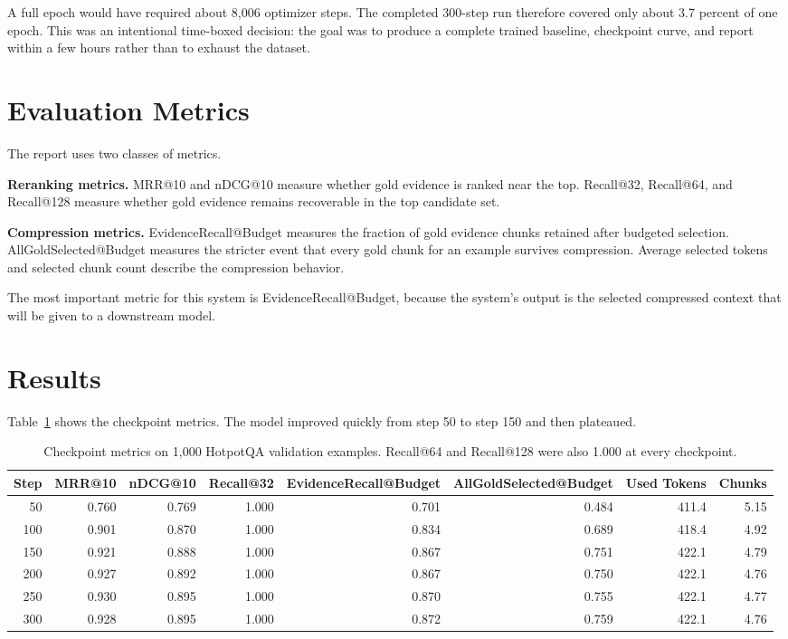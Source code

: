 \documentclass[10pt,twocolumn]{article}
\begin{document}
A full epoch would have required about 8,006 optimizer steps. The completed 300-step run therefore covered only about 3.7 percent of one epoch. This was an intentional time-boxed decision: the goal was to produce a complete trained baseline, checkpoint curve, and report within a few hours rather than to exhaust the dataset.

\section{Evaluation Metrics}
The report uses two classes of metrics.

\textbf{Reranking metrics.} MRR@10 and nDCG@10 measure whether gold evidence is ranked near the top. Recall@32, Recall@64, and Recall@128 measure whether gold evidence remains recoverable in the top candidate set.

\textbf{Compression metrics.} EvidenceRecall@Budget measures the fraction of gold evidence chunks retained after budgeted selection. AllGoldSelected@Budget measures the stricter event that every gold chunk for an example survives compression. Average selected tokens and selected chunk count describe the compression behavior.

The most important metric for this system is EvidenceRecall@Budget, because the system's output is the selected compressed context that will be given to a downstream model.

\section{Results}
Table~\ref{tab:results} shows the checkpoint metrics. The model improved quickly from step 50 to step 150 and then plateaued.

\begin{table}[t]
\centering
\small
\begin{tabular}{rrrrrrrr}
\toprule
Step & MRR@10 & nDCG@10 & Recall@32 & EvidenceRecall@Budget & AllGoldSelected@Budget & Used Tokens & Chunks\\
\midrule
50 & 0.760 & 0.769 & 1.000 & 0.701 & 0.484 & 411.4 & 5.15\\
100 & 0.901 & 0.870 & 1.000 & 0.834 & 0.689 & 418.4 & 4.92\\
150 & 0.921 & 0.888 & 1.000 & 0.867 & 0.751 & 422.1 & 4.79\\
200 & 0.927 & 0.892 & 1.000 & 0.867 & 0.750 & 422.1 & 4.76\\
250 & 0.930 & 0.895 & 1.000 & 0.870 & 0.755 & 422.1 & 4.77\\
300 & 0.928 & 0.895 & 1.000 & 0.872 & 0.759 & 422.1 & 4.76\\
\bottomrule
\end{tabular}
\caption{Checkpoint metrics on 1,000 HotpotQA validation examples. Recall@64 and Recall@128 were also 1.000 at every checkpoint.}
\label{tab:results}
\end{table}
\end{document}
